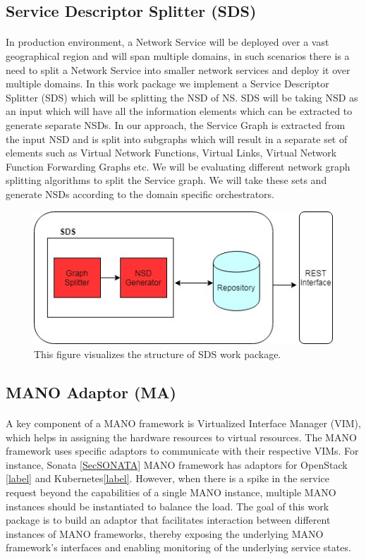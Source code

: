 \subsection{Service Descriptor Splitter (SDS)}
\paragraph{}

In production environment, a Network Service will be deployed over a vast geographical region and will span multiple domains, in such scenarios there is a need to split a Network Service into smaller network services and deploy it over multiple domains. In this work package we implement a Service Descriptor Splitter (SDS) which will be splitting the NSD of NS. SDS will be taking NSD as an input which will have all the information elements which can be extracted to generate separate NSDs. In our approach, the Service Graph is extracted from the input NSD and is split into subgraphs which will result in a separate set of elements such as Virtual Network Functions, Virtual Links, Virtual Network Function Forwarding Graphs etc. We will be evaluating different network graph splitting algorithms to split the Service graph. We will take these sets and generate NSDs according to the domain specific orchestrators.

\begin{figure}[h]
	\centering
	\includegraphics[width=0.7\linewidth]{figures/splitter_diagram}
	\caption{This figure visualizes the structure of SDS work package. }
	\label{fig:splitterDiagram}
\end{figure}

\subsection{MANO Adaptor (MA)}
\paragraph{}

A key component of a MANO framework is Virtualized Interface Manager (VIM),  which helps in assigning the hardware resources to virtual resources. The MANO framework uses specific adaptors to communicate with their respective VIMs. For instance, Sonata \ref{SecSONATA} MANO framework has adaptors for OpenStack \ref{label} and Kubernetes\ref{label}. However, when there is a spike in the service request beyond the capabilities of a single MANO instance, multiple MANO instances should be instantiated to balance the load. The goal of this work package is to build an adaptor that facilitates interaction between different instances of MANO frameworks, thereby exposing the underlying MANO framework's interfaces and enabling monitoring of the underlying service states.

